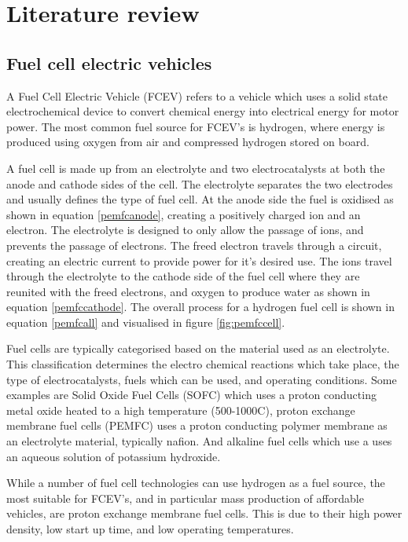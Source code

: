
\chapter{Literature review}

\section{Fuel cell electric vehicles}
A Fuel Cell Electric Vehicle (FCEV) refers to a vehicle which uses a solid state electrochemical device to convert chemical energy into electrical energy for motor power. The most common fuel source for FCEV's is hydrogen, where energy is produced using oxygen from air and compressed hydrogen stored on board. 

A fuel cell is made up from an electrolyte and two electrocatalysts at both the anode and cathode sides of the cell. The electrolyte separates the two electrodes and usually defines the type of fuel cell. At the anode side the fuel is oxidised as shown in equation \ref{pemfcanode}, creating a positively charged ion and an electron. The electrolyte is designed to only allow the passage of ions, and prevents the passage of electrons. The freed electron travels through a circuit, creating an electric current to provide power for it's desired use. The ions travel through the electrolyte to the cathode side of the fuel cell where they are reunited with the freed electrons, and oxygen to produce water as shown in equation \ref{pemfccathode}. The overall process for a hydrogen fuel cell is shown in equation \ref{pemfcall} and visualised in figure \ref{fig:pemfccell}. 

Fuel cells are typically categorised based on the material used as an electrolyte. This classification determines the electro chemical reactions which take place, the type of electrocatalysts, fuels which can be used, and operating conditions. Some examples are Solid Oxide Fuel Cells (SOFC) which uses a proton conducting metal oxide heated to a high temperature (500-1000\textdegree C), proton exchange membrane fuel cells (PEMFC) uses a proton conducting polymer membrane as an electrolyte material, typically nafion. And alkaline fuel cells which use a uses an aqueous solution of potassium hydroxide.  

While a number of fuel cell technologies can use hydrogen as a fuel source, the most suitable for FCEV's, and in particular mass production of affordable vehicles, are proton exchange membrane fuel cells. This is due to their high power density, low start up time, and low operating temperatures. \cite{Alaswad2016}


